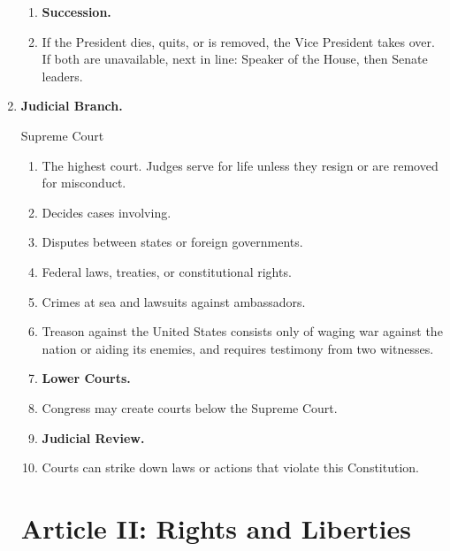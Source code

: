 \documentclass{article}
\begin{document}
\begin{multicols}{2}
\begin{enumerate}[label=\Alph*)]
\begin{enumerate}[label=1.2.\arabic*]
        \item[] \textbf{Succession.}
        
        \item If the President dies, quits, or is removed, the Vice President takes over. If both are unavailable, next in line: Speaker of the House, then Senate leaders.
    \end{enumerate}
    
    \item \textbf{Judicial Branch.}
    
    Supreme Court
    
    \begin{enumerate}[label=1.3.\arabic*]
        \item The highest court. Judges serve for life unless they resign or are removed for misconduct.
        
        \item[] Decides cases involving.
        
        \item Disputes between states or foreign governments.
        
        \item Federal laws, treaties, or constitutional rights.
        
        \item Crimes at sea and lawsuits against ambassadors.
        
        \item Treason against the United States consists only of waging war against the nation or aiding its enemies, and requires testimony from two witnesses.
        
        \item[] \textbf{Lower Courts.}
        
        \item Congress may create courts below the Supreme Court.
        
        \item[] \textbf{Judicial Review.}
        
        \item Courts can strike down laws or actions that violate this Constitution.
    \end{enumerate}
 

\section*{Article II: Rights and Liberties}


\end{enumerate}
\end{multicols}
\end{document}
